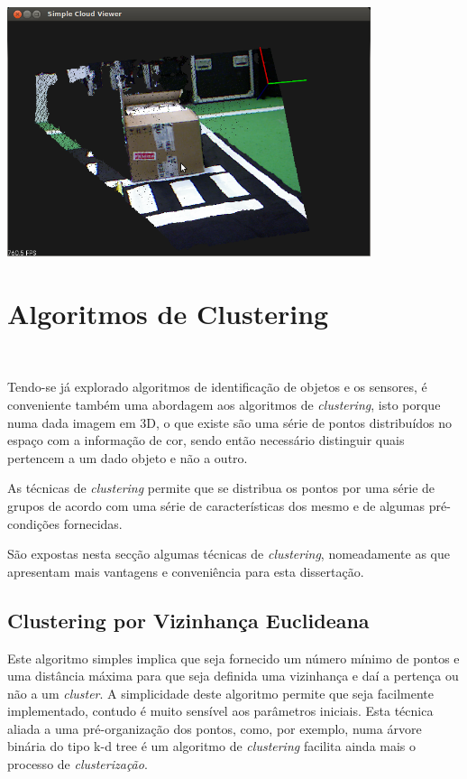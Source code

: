 \begin{center}
	\includegraphics[width=0.80\textwidth]{figures/pcl_color.png}
	\label{fig:pcl_color}
	
\end{center}


\section{Algoritmos de Clustering}~\label{sec:clustering}

Tendo-se já explorado algoritmos de identificação de objetos e os sensores, é conveniente também uma abordagem aos algoritmos de \emph{clustering}, isto porque numa dada imagem em 3D, o que existe são uma série de pontos distribuídos no espaço com a informação de cor, sendo então necessário distinguir quais pertencem a um dado objeto e não a outro.

As técnicas de \emph{clustering} permite que se distribua os pontos por uma série de grupos de acordo com uma série de características dos mesmo e de algumas pré-condições fornecidas.

São expostas nesta secção algumas técnicas de \emph{clustering}, nomeadamente as que apresentam mais vantagens e conveniência para esta dissertação.

\subsection{Clustering por Vizinhança Euclideana}

Este algoritmo simples implica que seja fornecido um número mínimo de pontos e uma distância máxima para que seja definida uma vizinhança e daí a pertença ou não a um \emph{cluster}. A simplicidade deste algoritmo permite que seja facilmente implementado, contudo é muito sensível aos parâmetros iniciais.
Esta técnica aliada a uma pré-organização dos pontos, como, por exemplo, numa árvore binária do tipo k-d tree\cite{Bentley:1975:MBS:361002.361007} é um algoritmo de \emph{clustering} facilita ainda mais o processo de \emph{clusterização}.


